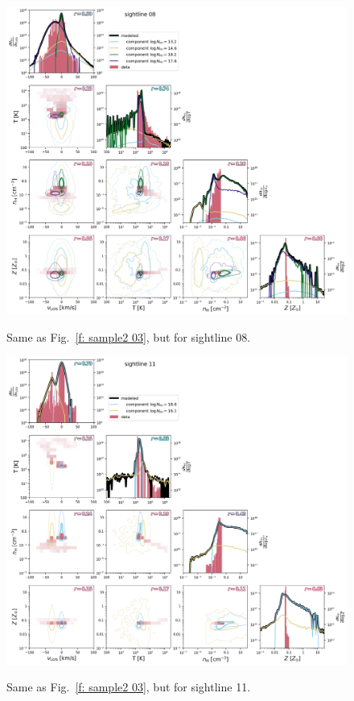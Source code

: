 \documentclass[fleqn,usenatbib]{mnras}
\begin{document}
\begin{figure}
    \centering
    \includegraphics[width=\textwidth]{figures/sample2/sightline_0008.png}
    \label{f: sample2 08}
    \caption{Same as Fig.~\ref{f: sample2 03}, but for sightline 08.}
\end{figure}

\begin{figure}
    \centering
    \includegraphics[width=\textwidth]{figures/sample2/sightline_0011.png}
    \label{f: sample2 11}
    \caption{Same as Fig.~\ref{f: sample2 03}, but for sightline 11.}
\end{figure}
\end{document}
